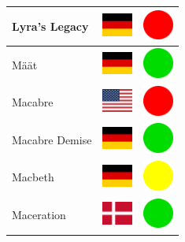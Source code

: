 \documentclass[12pt, a4paper, twoside]{report}
\begin{document}
\begin{center}
\begin{longtable}{|p{5cm}|p{2cm}|p{2cm}|}
 Lyra's Legacy                                              & \includegraphics[width=1cm]{../img/flags/de} &   \includegraphics[width=1cm]{../likes/n} \\ \hline
 Määt                                                       & \includegraphics[width=1cm]{../img/flags/de} &   \includegraphics[width=1cm]{../likes/y} \\ \hline
 Macabre                                                    & \includegraphics[width=1cm]{../img/flags/us} &   \includegraphics[width=1cm]{../likes/n} \\ \hline
 Macabre Demise                                             & \includegraphics[width=1cm]{../img/flags/de} &   \includegraphics[width=1cm]{../likes/y} \\ \hline
 Macbeth                                                    & \includegraphics[width=1cm]{../img/flags/de} &   \includegraphics[width=1cm]{../likes/m} \\ \hline
 Maceration                                                 & \includegraphics[width=1cm]{../img/flags/dk} &   \includegraphics[width=1cm]{../likes/y} \\ \hline

\end{longtable}
\end{center}
\end{document}
